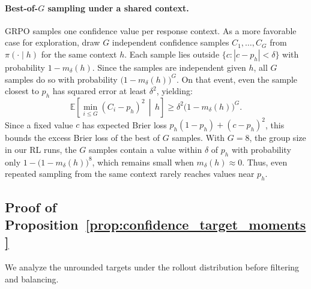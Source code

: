 \documentclass{article} %
\begin{document}
\paragraph{Best-of-$G$ sampling under a shared context.}
GRPO samples one confidence value per response context.
As a more favorable case for exploration, draw $G$ independent confidence samples $C_1, \ldots, C_G$ from $\pi(\cdot \mid h)$ for the same context $h$.
Each sample lies outside $\{c : |c - p_h| < \delta\}$ with probability $1 - m_\delta(h)$.
Since the samples are independent given $h$, all $G$ samples do so with probability $\bigl(1 - m_\delta(h)\bigr)^G$.
On that event, even the sample closest to $p_h$ has squared error at least $\delta^2$, yielding:
\begin{equation}
    \mathbb E\!\left[\min_{i \le G} (C_i - p_h)^2 \,\middle|\, h\right] \ge \delta^2 \bigl(1 - m_\delta(h)\bigr)^G.
\end{equation}
Since a fixed value $c$ has expected Brier loss $p_h(1-p_h) + (c - p_h)^2$, this bounds the excess Brier loss of the best of $G$ samples.
With $G = 8$, the group size in our RL runs, the $G$ samples contain a value within $\delta$ of $p_h$ with probability only $1 - \bigl(1 - m_\delta(h)\bigr)^8$, which remains small when $m_\delta(h) \approx 0$.
Thus, even repeated sampling from the same context rarely reaches values near $p_h$.

\subsection{Proof of Proposition~\ref{prop:confidence_target_moments}}
\label{sec:confidence_target_proof}

We analyze the unrounded targets under the rollout distribution before filtering and balancing.
\end{document}
